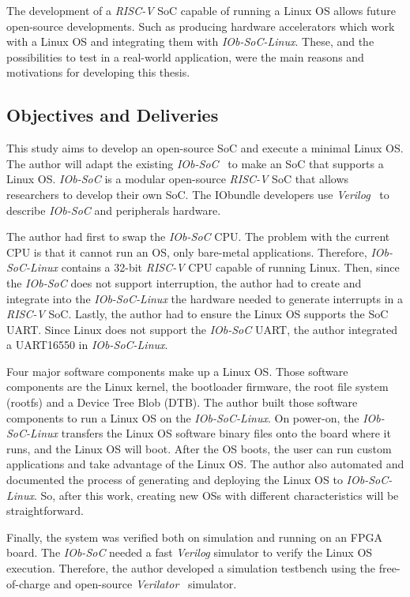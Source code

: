 The development of a \textit{RISC-V} SoC capable of running a Linux OS allows future open-source developments. Such as producing hardware accelerators which work with a Linux OS and integrating them with \textit{IOb-SoC-Linux}. These, and the possibilities to test in a real-world application, were the main reasons and motivations for developing this thesis.

\subsection{Objectives and Deliveries}

This study aims to develop an open-source SoC and execute a minimal Linux OS. The author will adapt the existing \textit{IOb-SoC}~\cite{iob_soc} to make an SoC that supports a Linux OS. \textit{IOb-SoC} is a modular open-source \textit{RISC-V} SoC that allows researchers to develop their own SoC. The IObundle developers use \textit{Verilog}~\cite{thomas2008verilog} to describe \textit{IOb-SoC} and peripherals hardware.

The author had first to swap the \textit{IOb-SoC} CPU. The problem with the current CPU is that it cannot run an OS, only bare-metal applications. Therefore, \textit{IOb-SoC-Linux} contains a 32-bit \textit{RISC-V} CPU capable of running Linux. Then, since the \textit{IOb-SoC} does not support interruption, the author had to create and integrate into the \textit{IOb-SoC-Linux} the hardware needed to generate interrupts in a \textit{RISC-V} SoC. Lastly, the author had to ensure the Linux OS supports the SoC UART. Since Linux does not support the \textit{IOb-SoC} UART, the author integrated a UART16550 in \textit{IOb-SoC-Linux}.

Four major software components make up a Linux OS. Those software components are the Linux kernel, the bootloader firmware, the root file system (rootfs) and a Device Tree Blob (DTB). The author built those software components to run a Linux OS on the \textit{IOb-SoC-Linux}. On power-on, the \textit{IOb-SoC-Linux} transfers the Linux OS software binary files onto the board where it runs, and the Linux OS will boot. After the OS boots, the user can run custom applications and take advantage of the Linux OS. The author also automated and documented the process of generating and deploying the Linux OS to \textit{IOb-SoC-Linux}. So, after this work, creating new OSs with different characteristics will be straightforward.

Finally, the system was verified both on simulation and running on an FPGA board. The \textit{IOb-SoC} needed a fast \textit{Verilog} simulator to verify the Linux OS execution. Therefore, the author developed a simulation testbench using the free-of-charge and open-source \textit{Verilator}~\cite{snyder2010verilator} simulator.
